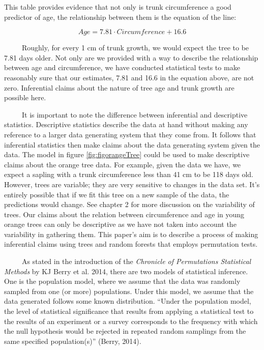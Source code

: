 \documentclass[12pt,twoside]{reedthesis}
\begin{document}
  This table provides evidence that not only is trunk circumference a good
  predictor of age, the relationship between them is the equation of the
  line:
  
  \[Age = 7.81 \cdot Circumference + 16.6\]
  
  ~~~~~Roughly, for every 1 cm of trunk growth, we would expect the tree
  to be 7.81 days older. Not only are we provided with a way to describe
  the relationship between age and circumference, we have conducted
  statistical tests to make reasonably sure that our estimates, 7.81 and
  16.6 in the equation above, are not zero. Inferential claims about the
  nature of tree age and trunk growth are possible here.
  
  ~~~~~It is important to note the difference between inferential and
  descriptive statistics. Descriptive statistics describe the data at hand
  without making any reference to a larger data generating system that
  they come from. It follows that inferential statistics then make claims
  about the data generating system given the data. The model in figure
  \ref{fig:figorangeTree} could be used to make descriptive claims about
  the orange tree data. For example, given the data we have, we expect a
  sapling with a trunk circumference less than 41 cm to be 118 days old.
  However, trees are variable; they are very sensitive to changes in the
  data set. It's entirely possible that if we fit this tree on a new
  sample of the data, the predictions would change. See chapter 2 for more
  discussion on the variability of trees. Our claims about the relation
  between circumference and age in young orange trees can only be
  descriptive as we have not taken into account the variability in
  gathering them. This paper's aim is to describe a process of making
  inferential claims using trees and random forests that employs
  permutation tests.
  
  ~~~~~As stated in the introduction of the \emph{Chronicle of
  Permutations Statistical Methods} by KJ Berry et al. 2014, there are two
  models of statistical inference. One is the population model, where we
  assume that the data was randomly sampled from one (or more)
  populations. Under this model, we assume that the data generated follows
  some known distribution. ``Under the population model, the level of
  statistical significance that results from applying a statistical test
  to the results of an experiment or a survey corresponds to the frequency
  with which the null hypothesis would be rejected in repeated random
  samplings from the same specified population(s)'' (Berry, 2014).
  
\end{document}
